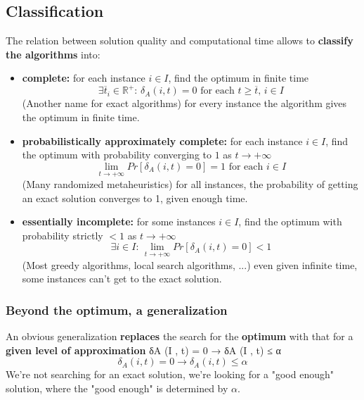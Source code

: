 \documentclass[11pt]{article}
\begin{document}
	\newpage
	
	\subsection{Classification}
	The relation between solution quality and computational time allows to \textbf{classify the algorithms} into:
	\begin{itemize}
		\item \textbf{complete:} for each instance $i \in I$, find the optimum in finite time
		$$ \exists \overline{t}_i \in \mathbb{R}^+ : \, \delta_A (i, t) = 0 \text{ for each } t \geq \overline{t}, \, i \in I $$
		(Another name for exact algorithms) for every instance the algorithm gives the optimum in finite time. \\
		
		\item \textbf{probabilistically approximately complete:} for each instance $i \in I$, find the optimum with probability converging to $1$ as $t \rightarrow + \infty$
		$$ \lim_{t \rightarrow + \infty} Pr \left[\delta_A (i, t) = 0\right] = 1 \text{ for each } i \in I $$
		(Many randomized metaheuristics) for all instances, the probability of getting an exact solution converges to 1, given enough time. \\
		
		\item \textbf{essentially incomplete:} for some instances $i \in I$, find the optimum with probability strictly $< 1$ as $t \rightarrow + \infty$
		$$ \exists i \in I: \, \lim_{t \rightarrow + \infty} Pr \left[\delta_A (i, t) = 0 \right] < 1 $$
		(Most greedy algorithms, local search algorithms, ...) even given infinite time, some instances can't get to the exact solution. \\
	\end{itemize}
	
	\newpage
	
	\subsubsection{Beyond the optimum, a generalization}
	An obvious generalization \textbf{replaces} the search for the \textbf{optimum} with that for a \textbf{given level of approximation}
	δA (I , t) = 0 → δA (I , t) ≤ α
	$$ \delta_A (i, t) = 0 \rightarrow \delta_A (i, t) \leq \alpha $$
	We're not searching for an exact solution, we're looking for a "good enough" solution, where the "good enough" is determined by $\alpha$.\\
	
\end{document}
